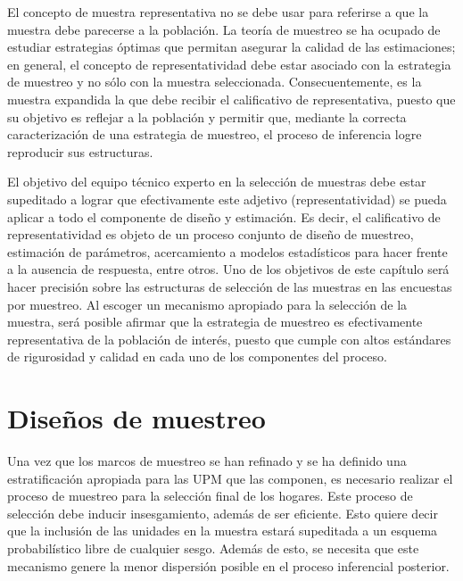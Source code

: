 \documentclass[
  12pt,
]{book}
\begin{document}
El concepto de muestra representativa no se debe usar para referirse a que la muestra debe parecerse a la población. La teoría de muestreo se ha ocupado de estudiar estrategias óptimas que permitan asegurar la calidad de las estimaciones; en general, el concepto de representatividad debe estar asociado con la estrategia de muestreo y no sólo con la muestra seleccionada. Consecuentemente, es la muestra expandida la que debe recibir el calificativo de representativa, puesto que su objetivo es reflejar a la población y permitir que, mediante la correcta caracterización de una estrategia de muestreo, el proceso de inferencia logre reproducir sus estructuras.

El objetivo del equipo técnico experto en la selección de muestras debe estar supeditado a lograr que efectivamente este adjetivo (representatividad) se pueda aplicar a todo el componente de diseño y estimación. Es decir, el calificativo de representatividad es objeto de un proceso conjunto de diseño de muestreo, estimación de parámetros, acercamiento a modelos estadísticos para hacer frente a la ausencia de respuesta, entre otros. Uno de los objetivos de este capítulo será hacer precisión sobre las estructuras de selección de las muestras en las encuestas por muestreo. Al escoger un mecanismo apropiado para la selección de la muestra, será posible afirmar que la estrategia de muestreo es efectivamente representativa de la población de interés, puesto que cumple con altos estándares de rigurosidad y calidad en cada uno de los componentes del proceso.

\hypertarget{diseuxf1os-de-muestreo}{%
\section{Diseños de muestreo}\label{diseuxf1os-de-muestreo}}

Una vez que los marcos de muestreo se han refinado y se ha definido una estratificación apropiada para las UPM que las componen, es necesario realizar el proceso de muestreo para la selección final de los hogares. Este proceso de selección debe inducir insesgamiento, además de ser eficiente. Esto quiere decir que la inclusión de las unidades en la muestra estará supeditada a un esquema probabilístico libre de cualquier sesgo. Además de esto, se necesita que este mecanismo genere la menor dispersión posible en el proceso inferencial posterior.
\end{document}
